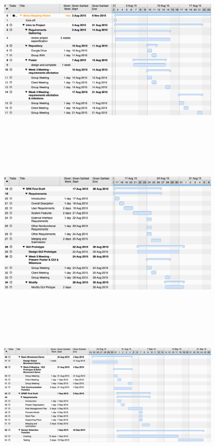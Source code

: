 \documentclass[11pt, a4paper]{article}
\begin{document}
\begin{figure}[H]
\centering
\includegraphics[height=3.5in]{SA1.png}
\end{figure}

\begin{figure}[H]
\centering
\includegraphics[height=3.5in]{SA2.png}
\end{figure}

\begin{figure}[H]
\centering
\includegraphics[height=3in]{SA3.png}
\end{figure}
\end{document}
